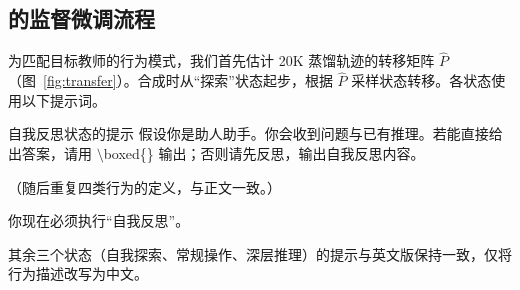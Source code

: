 \subsection{\method 的监督微调流程}
为匹配目标教师的行为模式，我们首先估计 20K 蒸馏轨迹的转移矩阵 $\hat{P}$（图~\ref{fig:transfer}）。合成时从“探索”状态起步，根据 $\hat{P}$ 采样状态转移。各状态使用以下提示词。

\begin{PromptBox}{自我反思状态的提示}
假设你是助人助手。你会收到问题与已有推理。若能直接给出答案，请用 $\setminus$boxed\{\} 输出；否则请先反思，输出自我反思内容。

（随后重复四类行为的定义，与正文一致。）

你现在必须执行“自我反思”。
\end{PromptBox}

其余三个状态（自我探索、常规操作、深层推理）的提示与英文版保持一致，仅将行为描述改写为中文。

